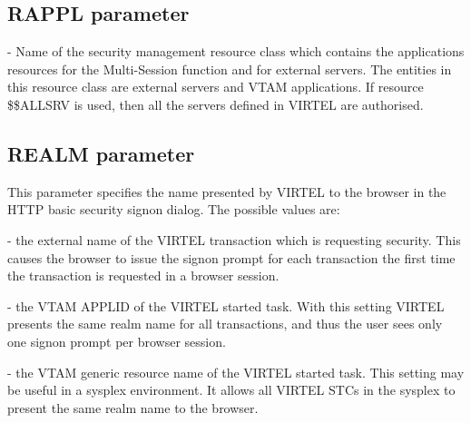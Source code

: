 \documentclass[letterpaper,10pt,english]{sphinxmanual}
\begin{document}
\subsection{RAPPL parameter}
\label{\detokenize{Installation_Guide:rappl-parameter}}\label{\detokenize{Installation_Guide:index-105}}
\begin{sphinxVerbatim}[commandchars=\\\{\}]
 
\end{sphinxVerbatim}

 - Name of the security management resource class which contains the applications resources for the Multi-Session function and for external servers. The entities in this resource class are external servers and VTAM applications. If resource \$\$ALLSRV is used, then all the servers defined in VIRTEL are authorised.

\ignorespaces 

\subsection{REALM parameter}
\label{\detokenize{Installation_Guide:realm-parameter}}\label{\detokenize{Installation_Guide:index-106}}
\begin{sphinxVerbatim}[commandchars=\\\{\}]
 
\end{sphinxVerbatim}

This parameter specifies the name presented by VIRTEL to the browser in the HTTP basic security signon dialog. The possible values are:

 - the external name of the VIRTEL transaction which is requesting security. This causes the browser to issue the signon prompt for each transaction the first time the transaction is requested in a browser session.

 - the VTAM APPLID of the VIRTEL started task. With this setting VIRTEL presents the same realm name for all transactions, and thus the user sees only one signon prompt per browser session.

 - the VTAM generic resource name of the VIRTEL started task. This setting may be useful in a sysplex environment. It allows all VIRTEL STCs in the sysplex to present the same realm name to the browser.
\end{document}
